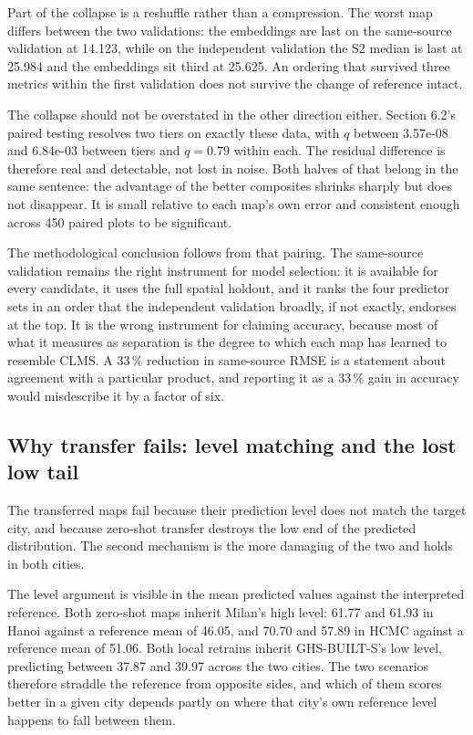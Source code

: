 \documentclass[11pt,a4paper]{article}
\begin{document}
Part of the collapse is a reshuffle rather than a compression. The worst map
differs between the two validations: the embeddings are last on the same-source
validation at 14.123, while on the independent validation the S2 median is last
at 25.984 and the embeddings sit third at 25.625. An ordering that survived
three metrics within the first validation does not survive the change of
reference intact.

The collapse should not be overstated in the other direction either. Section
6.2's paired testing resolves two tiers on exactly these data, with $q$ between
3.57e-08 and 6.84e-03 between tiers and $q = 0.79$ within each. The residual
difference is therefore real and detectable, not lost in noise. Both halves of
that belong in the same sentence: the advantage of the better composites shrinks
sharply but does not disappear. It is small relative to each map's own error and
consistent enough across 450 paired plots to be significant.

The methodological conclusion follows from that pairing. The same-source
validation remains the right instrument for model selection: it is available for
every candidate, it uses the full spatial holdout, and it ranks the four
predictor sets in an order that the independent validation broadly, if not
exactly, endorses at the top. It is the wrong instrument for claiming accuracy,
because most of what it measures as separation is the degree to which each map
has learned to resemble CLMS. A 33\,\% reduction in same-source RMSE is a
statement about agreement with a particular product, and reporting it as a 33\,\%
gain in accuracy would misdescribe it by a factor of six.

\subsection{Why transfer fails: level matching and the lost low tail}

The transferred maps fail because their prediction level does not match the
target city, and because zero-shot transfer destroys the low end of the
predicted distribution. The second mechanism is the more damaging of the two and
holds in both cities.

The level argument is visible in the mean predicted values against the
interpreted reference. Both zero-shot maps inherit Milan's high level: 61.77 and
61.93 in Hanoi against a reference mean of 46.05, and 70.70 and 57.89 in HCMC
against a reference mean of 51.06. Both local retrains inherit GHS-BUILT-S's low
level, predicting between 37.87 and 39.97 across the two cities. The two
scenarios therefore straddle the reference from opposite sides, and which of
them scores better in a given city depends partly on where that city's own
reference level happens to fall between them.
\end{document}
